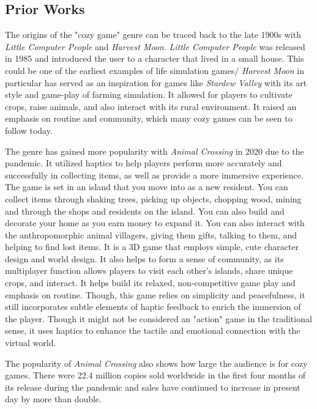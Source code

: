 \documentclass[10pt,twocolumn]{article}
\begin{document}
\subsection{Prior Works}
The origins of the "cozy game" genre can be traced back to the late 1900s with \textit{Little Computer People} and \textit{Harvest Moon}. \textit{Little Computer People} was released in 1985 and introduced the user to a character that lived in a small house. This could be one of the earliest examples of life simulation games/ \textit{Harvest Moon} in particular has served as an inspiration for games like \textit{Stardew Valley} with its art style and game-play of farming simulation. It allowed for players to cultivate crops, raise animals, and also interact with its rural environment. It raised an emphasis on routine and community, which many cozy games can be seen to follow today.

The genre has gained more popularity with \textit{Animal Crossing}\cite{animalcrossing2020} in 2020 due to the pandemic. It utilized haptics to help players perform more accurately and successfully in collecting items, as well as provide a more immersive experience. The game is set in an island that you move into as a new resident. You can collect items through shaking trees, picking up objects, chopping wood, mining and through the shops and residents on the island. You can also build and decorate your home as you earn money to expand it. You can also interact with the anthropomorphic animal villagers, giving them gifts, talking to them, and helping to find lost items. It is a 3D game that employs simple, cute character design and world design. It also helps to form a sense of community, as its multiplayer function allows players to visit each other's islands, share unique crops, and interact. It helps build its relaxed, non-competitive game play and emphasis on routine. Though, this game relies on simplicity and peacefulness, it still incorporates subtle elements of haptic feedback to enrich the immersion of the player. Though it might not be considered an "action" game in the traditional sense, it uses haptics to enhance the tactile and emotional connection with the virtual world.

The popularity of \textit{Animal Crossing}\cite{animalcrossing2020} also shows how large the audience is for cozy games. There were 22.4 million copies sold worldwide in the first four months of its release during the pandemic and sales have continued to increase in present day by more than double\cite{Statista2024}.
\end{document}
